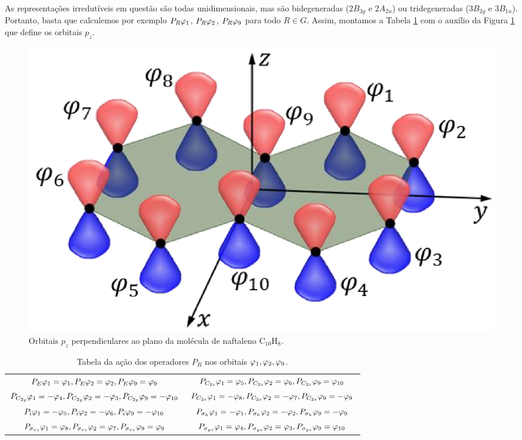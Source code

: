 \documentclass[a4paper,10pt]{article}
\begin{document}
As representações irredutíveis em questão são todas unidimensionais, mas são bidegeneradas ($2 B_{3g}$ e $2 A_{2u}$) ou tridegeneradas ($3 B_{2g}$ e $3 B_{1u}$). Portanto, basta que calculemos por exemplo $P_R \varphi_1$, $P_R \varphi_2$, $P_R \varphi_9$ para todo $R \in G$. Assim, montamos a Tabela \ref{tab:proj} com o auxílio da Figura \ref{fig:orbitais_pz-naft} que define os orbitais $p_z$.
\begin{figure}[H]
\centering
\includegraphics[width=0.6\linewidth]{fig/orbitais_pz-naft.png}
\caption{Orbitais $p_z$ perpendiculares ao plano da molécula de naftaleno C$_{10}$H$_8$.}
\label{fig:orbitais_pz-naft}
\end{figure}


\begin{table}[H]
\caption{Tabela da ação dos operadores $P_R$ nos orbitais $\varphi_1, \varphi_2, \varphi_9$.}
\centering
\footnotesize

\begin{tabular} { | c c | }
\hline
$P_{E} \varphi_1 =  \varphi_1, P_{E} \varphi_2 =   \varphi_2, P_E \varphi_9 = \varphi_9$ & $P_{C_{2z}} \varphi_1 = \varphi_5, P_{C_{2z}} \varphi_2 = \varphi_6, P_{C_{2z}} \varphi_9 = \varphi_{10}$ \\
$P_{C_{2y}} \varphi_1 = -\varphi_4, P_{C_{2y}} \varphi_2 = -\varphi_3, P_{C_{2y}} \varphi_9 = -\varphi_{10}$ & $P_{C_{2x}} \varphi_1 = -\varphi_8, P_{C_{2x}} \varphi_2 = -\varphi_7, P_{C_{2x}} \varphi_9 = -\varphi_9$ \\
$P_{i} \varphi_1 = -\varphi_5, P_{i} \varphi_2 = -\varphi_6, P_{i} \varphi_9 = -\varphi_{10}$ & $P_{\sigma_h} \varphi_1 = -\varphi_1, P_{\sigma_h} \varphi_2 = -\varphi_2, P_{\sigma_h} \varphi_9 = -\varphi_9$ \\
$P_{\sigma_{xz}} \varphi_1 = \varphi_8, P_{\sigma_{xz}} \varphi_2 = \varphi_7, P_{\sigma_{xz}} \varphi_9 = \varphi_9$ & $P_{\sigma_{yz}} \varphi_1 = \varphi_4, P_{\sigma_{yz}} \varphi_2 = \varphi_3, P_{\sigma_{yz}} \varphi_9 = \varphi_{10}$ \\
\hline
\end{tabular}

\label{tab:proj}
\end{table}
\end{document}
